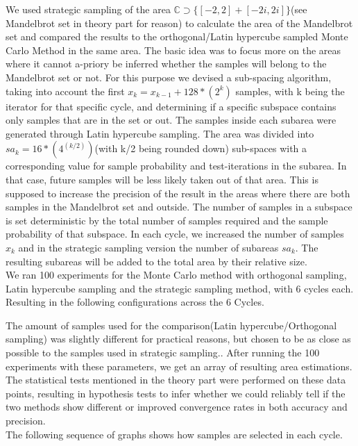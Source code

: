 \documentclass{uva-inf-article}
\begin{document}
We used strategic sampling of the area $\mathbb{C} \supset \{[-2,2] +[-2i,2i]\}$(see Mandelbrot set in theory part for reason) to calculate the area of the Mandelbrot set and compared the results to 
the orthogonal/Latin hypercube sampled Monte Carlo Method in the same area.
The basic idea was to focus more on the areas where it cannot a-priory be inferred whether the samples 
will belong to the Mandelbrot set or not.
For this purpose we devised a sub-spacing algorithm, taking into account the first $x_k = x_{k-1}+ 128 * (2^k)$ 
samples, with k being the iterator for that specific cycle, and determining if a specific subspace contains only samples that are in the set or out. The samples inside each subarea were generated through Latin hypercube sampling. The area was divided into $sa_k = 16*(4^(k/2))$(with k/2 being rounded down) sub-spaces with a corresponding value for sample probability and test-iterations in the subarea. 
In that case, future samples will be less likely taken out of that area. This is supposed to increase the
precision of the result in the areas where there are both samples in the Mandelbrot set and outside.
The number of samples in a subspace is set deterministic by the total number of samples required and the sample probability of that subspace.
In each cycle, we increased the number of samples $x_k$ and in the strategic sampling version the number of subareas $sa_k$. 
The resulting subareas will be added to the total area by their relative size. 
\\
We ran 100 experiments for the Monte Carlo method with orthogonal sampling, Latin hypercube sampling and the strategic sampling method, with 
6 cycles each. Resulting in the following configurations across the 6 Cycles.


The amount of samples used for the comparison(Latin hypercube/Orthogonal sampling) was slightly different for practical reasons, but chosen to be as close as possible to the samples used in strategic sampling..
After running the 100 experiments with these parameters, we get an array of resulting area estimations.
The statistical tests mentioned in the theory part were performed on these data points, resulting in hypothesis tests to infer whether we could reliably tell if the two methods show different or improved convergence rates in both accuracy and precision.\\
The following sequence of graphs shows how samples are selected in each cycle.\\
\end{document}
